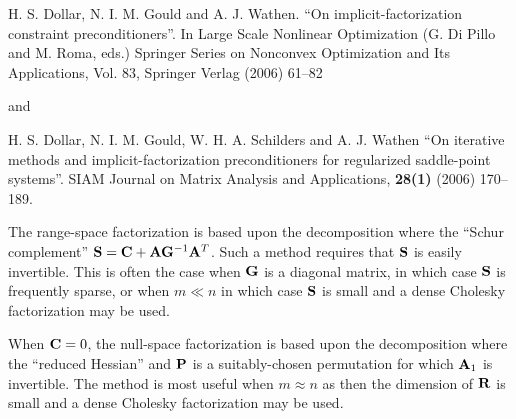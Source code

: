 \documentclass{galahad}
\begin{document}
\noindent
H. S. Dollar, N. I. M. Gould and A. J. Wathen.
``On implicit-factorization constraint preconditioners''.
In  Large Scale Nonlinear Optimization (G. Di Pillo and M. Roma, eds.)
Springer Series on Nonconvex Optimization and Its Applications, Vol. 83,
Springer Verlag (2006) 61--82

\noindent
and

\noindent
H. S. Dollar, N. I. M. Gould, W. H. A. Schilders and A. J. Wathen
``On iterative methods and implicit-factorization preconditioners for 
regularized saddle-point systems''.
SIAM Journal on Matrix Analysis and Applications, {\bf 28(1)} (2006) 170--189.
\vspace*{1mm}

\noindent
The range-space factorization is based upon the decomposition
where the ``Schur complement'' ${\mathbf{S}} = {\mathbf{C}} + {\mathbf{A}} {\mathbf{G}}^{-1} {\mathbf{A}}^T$.
Such a method requires that ${\mathbf{S}}$ is easily invertible. This is often the
case when ${\mathbf{G}}$ is a diagonal matrix, in which case ${\mathbf{S}}$ is frequently 
sparse, or when $m \ll n$ in which case ${\mathbf{S}}$ 
is small and a dense Cholesky factorization may be used.
\vspace*{1mm}

\noindent
When ${\mathbf{C}} = 0$, the null-space factorization is based upon the decomposition
where the ``reduced Hessian''
and ${\mathbf{P}}$ is a suitably-chosen permutation for which ${\mathbf{A}}_1$ is invertible.
The method is most useful when $m \approx n$ as then the dimension
of ${\mathbf{R}}$ is small and a dense Cholesky factorization may be used.
\end{document}

